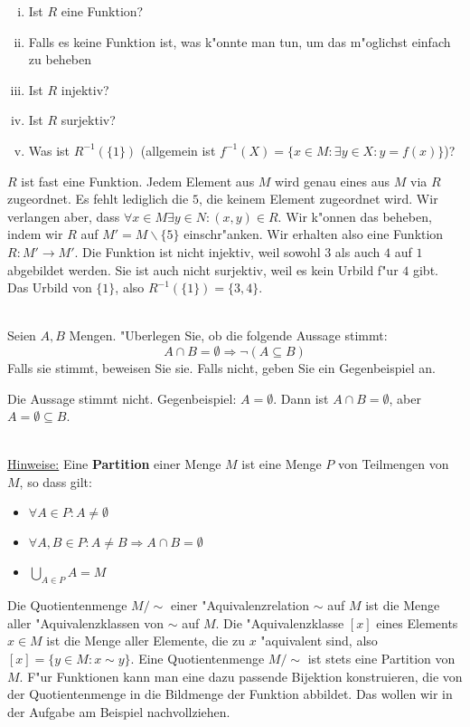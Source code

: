 \begin{enumerate}[(i)]
    \item Ist $R$ eine Funktion?
    \item Falls es keine Funktion ist, was k"onnte man tun, um das m"oglichst einfach zu beheben 
    \item Ist $R$ injektiv? 
    \item Ist $R$ surjektiv? 
    \item Was ist $R^{-1}(\{1\})$ (allgemein ist $f^{-1}(X)=\{x\in M:\exists y\in X:y=f(x)\}$)?
\end{enumerate}

\begin{loesung}
$R$ ist fast eine Funktion. Jedem Element aus $M$ wird genau eines aus $M$ via $R$ zugeordnet. Es fehlt lediglich die $5$, die keinem Element zugeordnet wird. Wir verlangen aber, dass $\forall x\in M\exists y\in N:(x,y)\in R$.
Wir k"onnen das beheben, indem wir $R$ auf $M'=M\backslash\{5\}$ einschr"anken. Wir erhalten also eine Funktion $R:M'\to M'$.
Die Funktion ist nicht injektiv, weil sowohl $3$ als auch $4$ auf $1$ abgebildet werden. Sie ist auch nicht surjektiv, weil es kein Urbild f"ur $4$ gibt.
Das Urbild von $\{1\}$, also $R^{-1}(\{1\})=\{3,4\}$.
\end{loesung}


\\
Seien $A,B$ Mengen. "Uberlegen Sie, ob die folgende Aussage stimmt: 
\[A\cap B=\emptyset\Rightarrow \neg (A\subseteq B)\]
Falls sie stimmt, beweisen Sie sie. Falls nicht, geben Sie ein Gegenbeispiel an.

\begin{loesung}
Die Aussage stimmt nicht. Gegenbeispiel: $A=\emptyset$. Dann ist $A\cap B=\emptyset$, aber $A=\emptyset\subseteq B$.
\end{loesung}

\\
\underline{Hinweise:} Eine \textbf{Partition} einer Menge $M$ ist eine Menge $P$ von Teilmengen von $M$, so dass gilt:
\begin{itemize}
    \item $\forall A\in P: A\neq\emptyset$
    \item $\forall A,B\in P: A\neq B\Rightarrow A\cap B=\emptyset$
    \item $\bigcup_{A\in P}A=M$
\end{itemize}
Die Quotientenmenge $M/\sim$ einer "Aquivalenzrelation $\sim$ auf $M$ ist die Menge aller "Aquivalenzklassen von $\sim$ auf $M$. Die "Aquivalenzklasse $[x]$ eines Elements $x\in M$ ist die Menge aller Elemente, die zu $x$ "aquivalent sind, also $[x]=\{y\in M:x\sim y\}$.
Eine Quotientenmenge $M/\sim$ ist stets eine Partition von $M$.
F"ur Funktionen kann man eine dazu passende Bijektion konstruieren, die von der Quotientenmenge in die Bildmenge der Funktion abbildet. Das wollen wir in der Aufgabe am Beispiel nachvollziehen.

